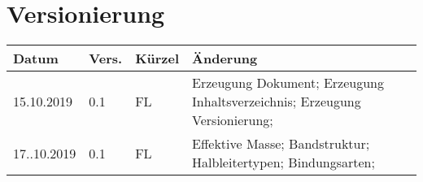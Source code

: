 \newpage
\tableofcontents

\section*{Versionierung}
\begin{tabular}{|p{2cm}|p{1cm}|p{1.5cm}|p{10.5cm}|}\hline
Datum & Vers. & Kürzel & Änderung \\ \hline
15.10.2019 & 0.1 & FL & Erzeugung Dokument; Erzeugung Inhaltsverzeichnis; Erzeugung Versionierung; \\ \hline
17..10.2019 & 0.1 & FL & Effektive Masse; Bandstruktur; Halbleitertypen;  Bindungsarten; \\ \hline
\end{tabular}
\listoffigures